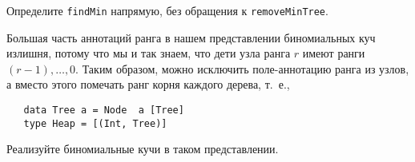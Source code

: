  \ifanswers
 \begin{frame}[fragile]{}
 \begin{exercise}\label{ex:3.5}
   Определите \lstinline!findMin! напрямую, без обращения к \lstinline!removeMinTree!.
 \end{exercise}
 
 \begin{exercise}\label{ex:3.6}
   Большая часть аннотаций ранга в нашем представлении биномиальных куч
   излишня, потому что мы и так знаем, что дети узла ранга $r$ имеют
   ранги $(r\!-\!1), \ldots, 0$. Таким образом, можно исключить
   поле-аннотацию ранга из узлов, а вместо этого помечать ранг корня
   каждого дерева, т.~е.,
   \begin{verbatim}
   data Tree a = Node  a [Tree]
   type Heap = [(Int, Tree)]
   \end{verbatim}
   Реализуйте биномиальные кучи в таком представлении.
 \end{exercise}
 \end{frame}
 
 
 \fi
 